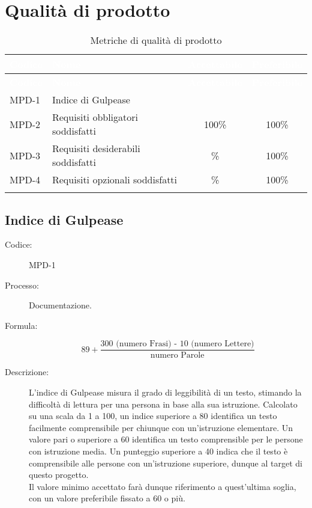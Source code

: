 \section{Qualità di prodotto} \label{sec:qualityprod}

{
\setlength{\tabcolsep}{10pt}
\renewcommand{\arraystretch}{1.5}
\begin{xltabular}{\textwidth}{| l | X | c | c |}
    \hline
     \textbf{\textcolor{white}{Codice}} & \textbf{\textcolor{white}{Nome}} & \textbf{\textcolor{white}{Accettabile}} & \textbf{\textcolor{white}{Preferibile}} \\
    \hline
    \endfirsthead
    \hline
     \textbf{\textcolor{white}{Codice}} & \textbf{\textcolor{white}{Nome}} & \textbf{\textcolor{white}{Accettabile}} & \textbf{\textcolor{white}{Preferibile}} \\ 
    \endhead
    MPD-1 & Indice di Gulpease &  &  \\
    \hline
    MPD-2 & Requisiti obbligatori soddisfatti & 100\% & 100\% \\
    \hline
    MPD-3 & Requisiti desiderabili soddisfatti & \% & 100\% \\
    \hline
    MPD-4 & Requisiti opzionali soddisfatti & \% & 100\% \\
    \hline
     \caption{Metriche di qualità di prodotto}
    \label{tab:mpd}
\end{xltabular}
}

\subsection{Indice di Gulpease}
\begin{description}
    \item[Codice:] MPD-1
    \item[Processo:] Documentazione.
    \item[Formula:] 
    \begin{equation}
    89 +
    \frac{\text{300 (numero Frasi) - 10 (numero Lettere)}}{\text{numero Parole}}
    \label{MPD-1}
    \end{equation}
    \item[Descrizione:] L'indice di Gulpease misura il grado di leggibilità di un testo, stimando la difficoltà di lettura per una persona in base alla sua istruzione. Calcolato su una scala da 1 a 100, un indice superiore a 80 identifica un testo facilmente comprensibile per chiunque con un'istruzione elementare. Un valore pari o superiore a 60 identifica un testo comprensible per le persone con istruzione media. Un punteggio superiore a 40 indica che il testo è comprensibile alle persone con un'istruzione superiore, dunque al target di questo progetto.\\Il valore minimo accettato farà dunque riferimento a quest'ultima soglia, con un valore preferibile fissato a 60 o più.
\end{description}

